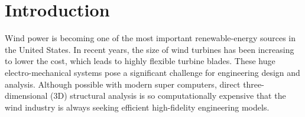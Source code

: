 \section{Introduction} 

Wind power is becoming one of the most important renewable-energy sources in
the United States.
In recent years, the size of wind
turbines has been increasing to lower the cost, which leads
to highly flexible turbine blades. These huge electro-mechanical systems pose
a significant challenge for engineering design and analysis. Although
possible with modern super computers, direct three-dimensional (3D)
structural analysis is so computationally expensive that the wind industry is
always seeking efficient high-fidelity engineering models.

